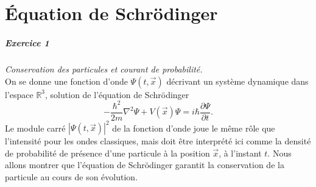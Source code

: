 \chapter{Équation de Schrödinger}

\paragraph{Exercice 1} \textit{Conservation des particules et courant de probabilité.} \\
On se donne une fonction d'onde $\Psi(t,\vec x)$ décrivant un système dynamique dans l'espace $\mathbb R^3$, solution de l'équation de Schrödinger 
\begin{equation}
\boxed{
-\frac{\hbar^2}{2m} \nabla^2 \Psi + V(\vec x) \Psi = i\hbar \frac{\partial\Psi}{\partial t}.
}
\end{equation}
Le module carré $|\Psi(t,\vec x)|^2$ de la fonction d'onde joue le même rôle que l'intensité pour les ondes classiques, mais doit être interprété ici comme la densité de probabilité de présence d'une particule à la position $\vec x$, à l'instant $t$. Nous allons montrer que l'équation de Schrödinger garantit la conservation de la particule au cours de son évolution. 
